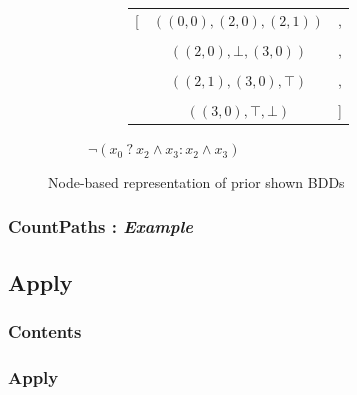 \documentclass[english, aspectratio=169]{beamer}
\begin{document}
\begin{frame}
\begin{figure}
\begin{subfigure}{0.49\linewidth}
      \begin{subfigure}[b]{0.33\linewidth}
        \centering
        \begin{tikzpicture}[scale=0.6, every node/.style={transform shape}]
          
        \end{tikzpicture}
      \end{subfigure}
      \begin{subfigure}[b]{0.55\linewidth}
        \centering
        { \tiny
          \begin{tabular}{r c l}
            [ & $((0,0), (2,0), (2,1))$ & ,
            \\ \\
              & $((2,0), \bot, (3,0))$  & ,
            \\ \\
              & $((2,1), (3,0), \top)$  & ,
            \\ \\
              & $((3,0), \top, \bot)$   & ]
          \end{tabular}
          \vspace{10pt}
        }
      \end{subfigure}

      \caption{$\neg(x_0\ ?\ x_2 \wedge x_3 : x_2 \wedge x_3)$}
    \end{subfigure}

    \caption{Node-based representation of prior shown BDDs}
  \end{figure}

\end{frame}

\begin{frame}
  \frametitle{CountPaths : \emph{Example}}

  
\end{frame}

\subsection{Apply}

\begin{frame}{}
  \frametitle{Contents}
\end{frame}

\begin{frame}
  \frametitle{Apply}


  
\end{frame}
\end{document}
